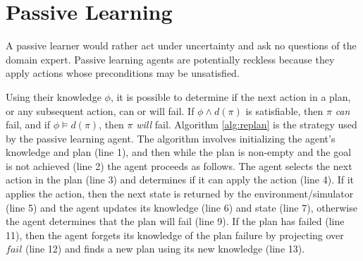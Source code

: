 \documentclass[letterpaper]{article}
\def\und#1{\noindent{\bf #1}:}
\def\goalie{{\tt Goalie}}
\begin{document}
\section{Passive Learning}

% 

A passive learner would rather act
under uncertainty and ask no questions of the domain expert.  Passive learning
agents are potentially reckless because 
they apply actions whose preconditions may be unsatisfied.  

Using their knowledge $\phi$, it is possible to determine if the next action in
a plan, or any subsequent action, can or will fail.  If  $\phi \wedge d(\pi)$ is
satisfiable, then $\pi$ {\em can} fail, and if $\phi \models d(\pi)$,
then $\pi$ {\em will}  fail.  
Algorithm \ref{alg:replan} is the strategy used by the passive learning agent. 
The algorithm involves initializing the agent's knowledge and plan (line 1), and then while
the plan is non-empty and the goal is not achieved (line 2) the agent proceeds
as follows.  The agent selects the next action in the plan (line 3) and
determines if it can apply the action (line 4).  If it applies the action, then
the next state is returned by the environment/simulator (line 5) and the agent
updates its knowledge (line 6) and state (line 7),
otherwise the agent determines that the plan will fail (line 9).  If the plan
has failed (line 11), then the agent forgets its knowledge of the plan failure
by projecting over $fail$ (line 12) and finds a new plan using its new knowledge
(line 13).
\end{document}
